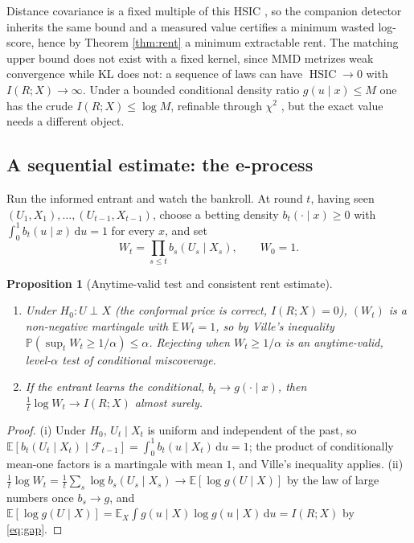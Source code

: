 \documentclass[11pt]{article}
\newtheorem{proposition}{Proposition}
\begin{document}
Distance covariance is a fixed multiple of this HSIC \citep{sejdinovic2013}, so the companion
detector inherits the same bound and a measured value certifies a minimum wasted log-score, hence
by Theorem \ref{thm:rent} a minimum extractable rent. The matching upper bound does not exist with
a fixed kernel, since MMD metrizes weak convergence \citep{simongabriel2023} while KL does not: a
sequence of laws can have $\operatorname{HSIC}\to 0$ with $I(R;X)\to\infty$. Under a bounded
conditional density ratio $g(u\mid x)\le M$ one has the crude $I(R;X)\le\log M$, refinable through
$\chi^2$ \citep{wangtay2022}, but the exact value needs a different object.

\subsection{A sequential estimate: the e-process}

Run the informed entrant and watch the bankroll. At round $t$, having seen
$(U_1,X_1),\dots,(U_{t-1},X_{t-1})$, choose a betting density $b_t(\cdot\mid x)\ge 0$ with
$\int_0^1 b_t(u\mid x)\,\mathrm du=1$ for every $x$, and set
\begin{equation}
W_t=\prod_{s\le t} b_s(U_s\mid X_s),\qquad W_0=1.
\end{equation}

\begin{proposition}[Anytime-valid test and consistent rent estimate]\label{prop:eprocess}
\quad
\begin{enumerate}
\item[(i)] Under $H_0:U\perp X$ (the conformal price is correct, $I(R;X)=0$), $(W_t)$ is a
non-negative martingale with $\mathbb E\,W_t=1$, so by Ville's inequality
$\mathbb P(\sup_t W_t\ge 1/\alpha)\le\alpha$. Rejecting when $W_t\ge 1/\alpha$ is an anytime-valid,
level-$\alpha$ test of conditional miscoverage.
\item[(ii)] If the entrant learns the conditional, $b_t\to g(\cdot\mid x)$, then
$\tfrac1t\log W_t\to I(R;X)$ almost surely.
\end{enumerate}
\end{proposition}

\begin{proof}
(i) Under $H_0$, $U_t\mid X_t$ is uniform and independent of the past, so
$\mathbb E[b_t(U_t\mid X_t)\mid\mathcal F_{t-1}]=\int_0^1 b_t(u\mid X_t)\,\mathrm du=1$; the product
of conditionally mean-one factors is a martingale with mean $1$, and Ville's inequality applies.
(ii) $\tfrac1t\log W_t=\tfrac1t\sum_s\log b_s(U_s\mid X_s)\to\mathbb E[\log g(U\mid X)]$ by the law
of large numbers once $b_s\to g$, and $\mathbb E[\log g(U\mid X)]=\mathbb E_X\int g(u\mid X)\log
g(u\mid X)\,\mathrm du=I(R;X)$ by \eqref{eq:gap}.
\end{proof}
\end{document}
